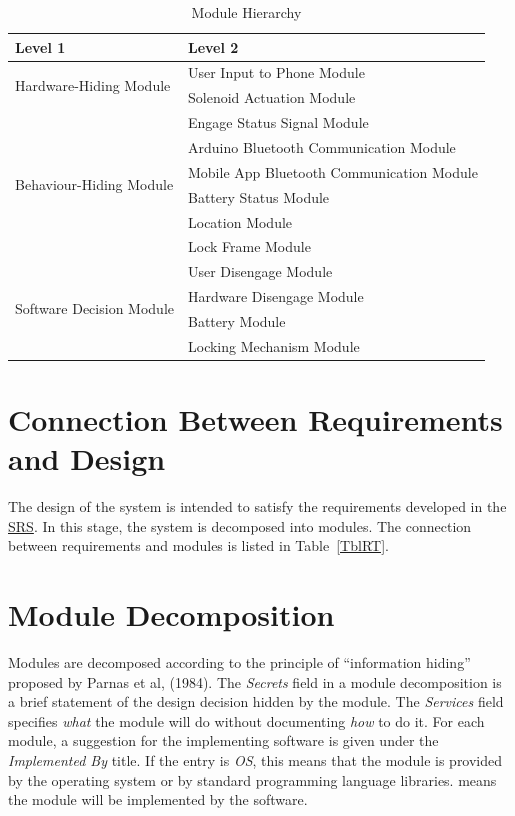 \documentclass[12pt, titlepage]{article}
\begin{document}
\begin{table}[h!]
\centering
\begin{tabular}{p{} p{}}
\toprule
\textbf{Level 1} & \textbf{Level 2}\\
\midrule

\multirow{2}{0.3\textwidth}{Hardware-Hiding Module} & User Input to Phone Module \\
& Solenoid Actuation Module \\
\midrule

\multirow{6}{0.3\textwidth}{Behaviour-Hiding Module} & Engage Status Signal Module  \\
& Arduino Bluetooth Communication Module\\
& Mobile App Bluetooth Communication Module\\
& Battery Status Module \\
& Location Module  \\
& Lock Frame Module \\
\midrule

\multirow{5}{0.3\textwidth}{Software Decision Module} & User Disengage Module \\
& Hardware Disengage Module \\
& Battery Module \\
& Locking Mechanism Module \\
\bottomrule

\end{tabular}
\caption{Module Hierarchy}
\label{TblMH}
\end{table}

\section{Connection Between Requirements and Design} \label{SecConnection}

The design of the system is intended to satisfy the requirements developed in
the \href{https://github.com/NevoAbigail/Capstone/blob/main/docs/SRS/SRS.pdf}{SRS}. In this stage, the system is decomposed into modules. The connection
between requirements and modules is listed in Table~\ref{TblRT}.

\section{Module Decomposition} \label{SecMD}

Modules are decomposed according to the principle of ``information hiding''
proposed by Parnas et al, (1984). The \emph{Secrets} field in a module
decomposition is a brief statement of the design decision hidden by the
module. The \emph{Services} field specifies \emph{what} the module will do
without documenting \emph{how} to do it. For each module, a suggestion for the
implementing software is given under the \emph{Implemented By} title. If the
entry is \emph{OS}, this means that the module is provided by the operating
system or by standard programming language libraries.  \emph{\progname{}} means the
module will be implemented by the \progname{} software.
\end{document}
